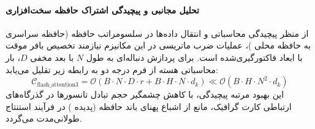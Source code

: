 \paragraph{تحلیل مجانبی و پیچیدگی اشتراک حافظه سخت‌افزاری}
از منظر پیچیدگی محاسباتی و انتقال داده‌ها در سلسومراتب حافظه (حافظه سراسری  به حافظه محلی )، عملیات ضرب ماتریسی در این مکانیزم نیازمند تخصیص بافر موقت با ابعاد فاکتورگیری‌شده است. برای پردازش دنباله‌ای به طول $N$ با بعد مخفی $D$، بار محاسباتی هسته از فرم درجه دو به رابطه زیر تقلیل می‌یابد:
\begin{equation}
\label{eq:complexity_flash_attention3}
\mathcal{C}_{\text{flash\_attention3}} = \mathcal{O}\left( B \cdot N \cdot D \cdot r + B \cdot H \cdot N \cdot d_k \right) \ll \mathcal{O}\left( B \cdot H \cdot N^2 \cdot d_k \right)
\end{equation}
این بهبود مرتبه پیچیدگی، با کاهش چشمگیر حجم تبادل تانسورها در گذرگاه‌های ارتباطی کارت گرافیک، مانع از اشباع پهنای باند حافظه (پدیده ) در فرآیند استنتاج طولانی‌مدت می‌گردد.